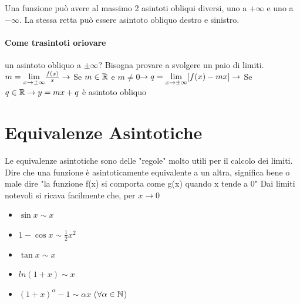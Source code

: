 \documentclass[12pt, a4paper, openany]{book}
\begin{document}
Una funzione può avere al massimo 2 asintoti obliqui diversi, uno a $+\infty$ e uno a $-\infty$.
La stessa retta può essere asintoto obliquo destro e sinistro.
\paragraph*{Come trasintoti oriovare} un asintoto obliquo a $\pm \infty$? %
Bisogna provare a svolgere un paio di limiti.
\\$m= \underset{x \to \pm \infty}{\lim} \frac{f(x)}{x} \rightarrow$ Se $m\in\mathbb{R}$ e $m\neq 0$$ \rightarrow 
q=\underset{x \to \pm \infty}{\lim} [f(x)-mx] \rightarrow$ Se $q\in\mathbb{R} \rightarrow y=mx+q$ 
è asintoto obliquo
\section{Equivalenze Asintotiche}
Le equivalenze asintotiche sono delle "regole" molto utili per il calcolo dei limiti.
Dire che una funzione è asintoticamente equivalente a un altra, significa bene o male dire "la funzione f(x) si comporta come g(x) quando x tende a 0"
Dai limiti notevoli si ricava facilmente che, per $x \to 0$
\begin{itemize}
	\item $\sin x \sim x$
	\item $1 - \cos x \sim \frac{1}{2}x^2$
	\item $\tan x \sim x$
	\item $ln(1+x) \sim x$
	\item $(1+x)^\alpha -1 \sim \alpha x$ ($\forall \alpha \in \mathbb{N}$)
\end{itemize}
\end{document}

